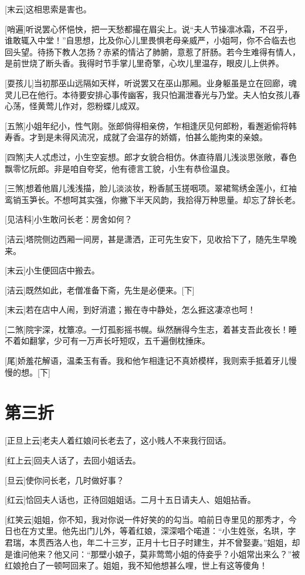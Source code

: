 \documentclass{book}
\newcommand\nchapter[1]{\chapter*{#1}\markboth{#1}{}\addcontentsline{toc}{chapter}{#1}}
\begin{document}
[末云]这相思索是害也。

[哨遍]听说罢心怀悒怏，把一天愁都撮在眉尖上。说``夫人节操凛冰霜，不召乎，谁敢辄入中堂！''自思想，比及你心儿里畏惧老母亲威严，小姐呵，你不合临去也回头望。待扬下教人怎扬？赤紧的情沾了肺腑，意惹了肝肠。若今生难得有情人，是前世烧了断头香。我得时节手掌儿里奇擎，心坎儿里温存，眼皮儿上供养。

[耍孩儿]当初那巫山远隔如天样，听说罢又在巫山那厢。业身躯虽是立在回廊，魂灵儿已在他行。本待要安排心事传幽客，我只怕漏泄春光与乃堂。夫人怕女孩儿春心荡，怪黄莺儿作对，怨粉蝶儿成双。

[五煞]小姐年纪小，性气刚。张郎倘得相亲傍，乍相逢厌见何郎粉，看邂逅偷将韩寿香。才到是未得风流况，成就了会温存的娇婿，怕甚么能拘束的亲娘。

[四煞]夫人忒虑过，小生空妄想。郎才女貌合相仿。休直待眉儿浅淡思张敞，春色飘零忆阮郎。非是咱自夸奖，他有德言工貌，小生有恭俭温良。

[三煞]想着他眉儿浅浅描，脸儿淡淡妆，粉香腻玉搓咽项。翠裙鸳绣金莲小，红袖鸾销玉笋长。不想呵其实强，你撇下半天风韵，我拾得万种思量。却忘了辞长老。

[见洁科]小生敢问长老：房舍如何？

[洁云]塔院侧边西厢一间房，甚是潇洒，正可先生安下，见收拾下了，随先生早晚来。

[末云]小生便回店中搬去。

[洁云]既然如此，老僧准备下斋，先生是必便来。[下]

[末云]若在店中人闹，到好消遣；搬在寺中静处，怎么捱这凄凉也呵！

[二煞]院宇深，枕簟凉。一灯孤影摇书幌。纵然酬得今生志，着甚支吾此夜长！睡不着如翻掌，少可有一万声长吁短叹，五千遍倒枕捶床。

[尾]娇羞花解语，温柔玉有香。我和他乍相逢记不真娇模样，我则索手抵着牙儿慢慢的想。[下]

\nchapter{第三折}

[正旦上云]老夫人着红娘问长老去了，这小贱人不来我行回话。

[红上云]回夫人话了，去回小姐话去。

[旦云]使你问长老，几时做好事？

[红云]恰回夫人话也，正待回姐姐话。二月十五日请夫人、姐姐拈香。

[红笑云]姐姐，你不知，我对你说一件好笑的的勾当。咱前日寺里见的那秀才，今日也在方丈里。他先出门儿外，等着红娘，深深唱个喏道：``小生姓张，名珙，字君瑞，本贯西洛人也，年二十三岁，正月十七日子时建生，并不曾娶妻。''姐姐，却是谁问他来？他又问：``那壁小娘子，莫非莺莺小姐的侍妾乎？小姐常出来么？''被红娘抢白了一顿呵回来了。姐姐，我不知他想甚么哩，世上有这等傻角！
\end{document}

